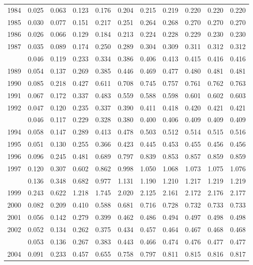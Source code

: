 \documentclass[
]{article}
\begin{document}
\begin{longtable}[t]{lrrrrrrrrrr}
1984 & 0.025 & 0.063 & 0.123 & 0.176 & 0.204 & 0.215 & 0.219 & 0.220 & 0.220 & 0.220\\
1985 & 0.030 & 0.077 & 0.151 & 0.217 & 0.251 & 0.264 & 0.268 & 0.270 & 0.270 & 0.270\\
1986 & 0.026 & 0.066 & 0.129 & 0.184 & 0.213 & 0.224 & 0.228 & 0.229 & 0.230 & 0.230\\
1987 & 0.035 & 0.089 & 0.174 & 0.250 & 0.289 & 0.304 & 0.309 & 0.311 & 0.312 & 0.312\\
\addlinespace
1988 & 0.046 & 0.119 & 0.233 & 0.334 & 0.386 & 0.406 & 0.413 & 0.415 & 0.416 & 0.416\\
1989 & 0.054 & 0.137 & 0.269 & 0.385 & 0.446 & 0.469 & 0.477 & 0.480 & 0.481 & 0.481\\
1990 & 0.085 & 0.218 & 0.427 & 0.611 & 0.708 & 0.745 & 0.757 & 0.761 & 0.762 & 0.763\\
1991 & 0.067 & 0.172 & 0.337 & 0.483 & 0.559 & 0.588 & 0.598 & 0.601 & 0.602 & 0.603\\
1992 & 0.047 & 0.120 & 0.235 & 0.337 & 0.390 & 0.411 & 0.418 & 0.420 & 0.421 & 0.421\\
\addlinespace
1993 & 0.046 & 0.117 & 0.229 & 0.328 & 0.380 & 0.400 & 0.406 & 0.409 & 0.409 & 0.409\\
1994 & 0.058 & 0.147 & 0.289 & 0.413 & 0.478 & 0.503 & 0.512 & 0.514 & 0.515 & 0.516\\
1995 & 0.051 & 0.130 & 0.255 & 0.366 & 0.423 & 0.445 & 0.453 & 0.455 & 0.456 & 0.456\\
1996 & 0.096 & 0.245 & 0.481 & 0.689 & 0.797 & 0.839 & 0.853 & 0.857 & 0.859 & 0.859\\
1997 & 0.120 & 0.307 & 0.602 & 0.862 & 0.998 & 1.050 & 1.068 & 1.073 & 1.075 & 1.076\\
\addlinespace
1998 & 0.136 & 0.348 & 0.682 & 0.977 & 1.131 & 1.190 & 1.210 & 1.217 & 1.219 & 1.219\\
1999 & 0.243 & 0.622 & 1.218 & 1.745 & 2.020 & 2.125 & 2.161 & 2.172 & 2.176 & 2.177\\
2000 & 0.082 & 0.209 & 0.410 & 0.588 & 0.681 & 0.716 & 0.728 & 0.732 & 0.733 & 0.733\\
2001 & 0.056 & 0.142 & 0.279 & 0.399 & 0.462 & 0.486 & 0.494 & 0.497 & 0.498 & 0.498\\
2002 & 0.052 & 0.134 & 0.262 & 0.375 & 0.434 & 0.457 & 0.464 & 0.467 & 0.468 & 0.468\\
\addlinespace
2003 & 0.053 & 0.136 & 0.267 & 0.383 & 0.443 & 0.466 & 0.474 & 0.476 & 0.477 & 0.477\\
2004 & 0.091 & 0.233 & 0.457 & 0.655 & 0.758 & 0.797 & 0.811 & 0.815 & 0.816 & 0.817\\

\end{longtable}
\end{document}
